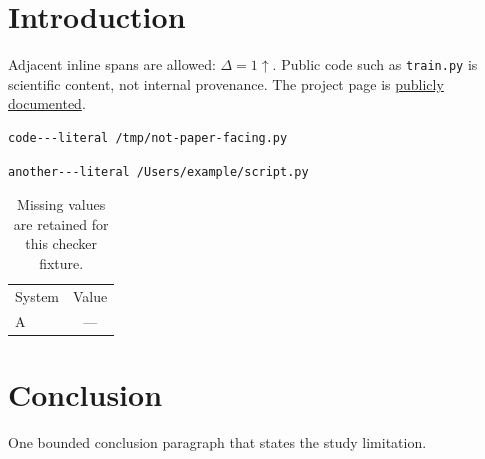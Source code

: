 \documentclass{article}
\begin{document}
\section{Introduction}
Adjacent inline spans are allowed: $\Delta = 1$$\uparrow$.
Public code such as \texttt{train.py} is scientific content, not internal provenance.
The project page is \href{https://example.org/a---b}{publicly documented}.
\begin{verbatim}
code---literal /tmp/not-paper-facing.py
\end{verbatim}
\begin{lstlisting}
another---literal /Users/example/script.py
\end{lstlisting}
\begin{table}
\caption{Missing values are retained for this checker fixture.}
\begin{tabular}{lc}
System & Value \\[2pt]
A & --- \\
\end{tabular}
\end{table}
\section{Conclusion}
One bounded conclusion paragraph that states the study limitation.
\end{document}
